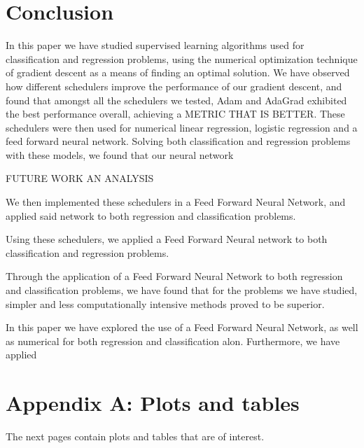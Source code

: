 \documentclass[onecolumn,10pt,cleanfoot]{asme2ej}
\begin{document}
\section{Conclusion}


In this paper we have studied supervised learning algorithms used for classification and regression problems, using the numerical optimization technique of gradient descent as a means of finding an optimal solution. We have observed how different schedulers improve the performance of our gradient descent, and found that amongst all the schedulers we tested, Adam and AdaGrad exhibited the best performance overall, achieving a METRIC THAT IS BETTER. These schedulers were then used for numerical linear regression, logistic regression and a feed forward neural network. Solving both classification and regression problems with these models, we found that our neural network 

FUTURE WORK AN ANALYSIS

We then implemented these schedulers in a Feed Forward Neural Network, and applied said network to both regression and classification problems. 

Using these schedulers, we applied a Feed Forward Neural network to both classification and regression problems.

Through the application of a Feed Forward Neural Network to both regression and classification problems, we have found that for the problems we have studied, simpler and less computationally intensive methods proved to be superior.

In this paper we have explored the use of a Feed Forward Neural Network, as well as numerical  for both regression and classification alon. Furthermore, we have applied 




\section*{Appendix A: Plots and tables}

The next pages contain plots and tables that are of interest.
\end{document}

